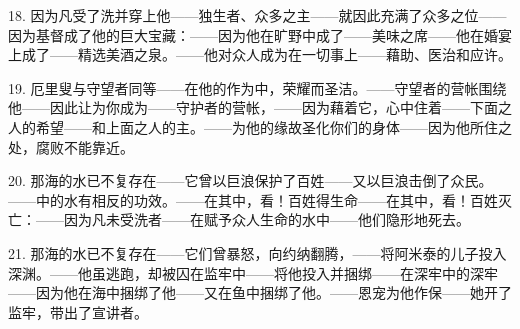 18. 因为凡受了洗并穿上他——\newline{}独生者、众多之主——\newline{}就因此充满了众多之位——\newline{}因为基督成了他的巨大宝藏：——\newline{}因为他在旷野中成了——\newline{}美味之席——\newline{}他在婚宴上成了——\newline{}精选美酒之泉。——\newline{}他对众人成为在一切事上——\newline{}藉助、医治和应许。\par

19. 厄里叟与守望者同等——\newline{}在他的作为中，荣耀而圣洁。——\newline{}守望者的营帐围绕他——\newline{}因此让为你成为——\newline{}守护者的营帐，——\newline{}因为藉着它，心中住着——\newline{}下面之人的希望——\newline{}和上面之人的主。——\newline{}为他的缘故圣化你们的身体——\newline{}因为他所住之处，腐败不能靠近。\par

20. 那海的水已不复存在——\newline{}它曾以巨浪保护了百姓——\newline{}又以巨浪击倒了众民。——\newline{}中的水有相反的功效。——\newline{}在其中，看！百姓得生命——\newline{}在其中，看！百姓灭亡：——\newline{}因为凡未受洗者——\newline{}在赋予众人生命的水中——\newline{}他们隐形地死去。\par

21. 那海的水已不复存在——\newline{}它们曾暴怒，向约纳翻腾，——\newline{}将阿米泰的儿子投入深渊。——\newline{}他虽逃跑，却被囚在监牢中——\newline{}将他投入并捆绑——\newline{}在深牢中的深牢——\newline{}因为他在海中捆绑了他——\newline{}又在鱼中捆绑了他。——\newline{}恩宠为他作保——\newline{}她开了监牢，带出了宣讲者。\par

